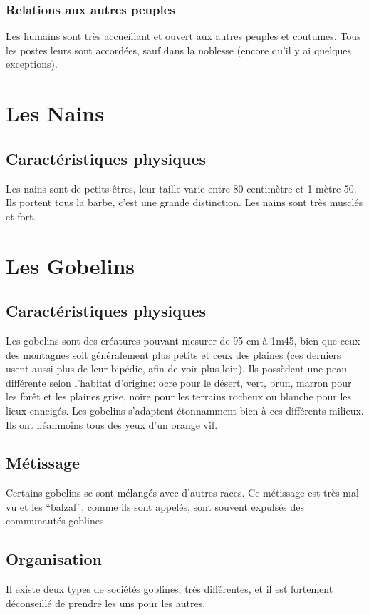 \subsubsection{Relations aux autres peuples}
Les humains sont très accueillant et ouvert aux autres peuples et coutumes. Tous les postes leurs sont accordées, sauf dans la noblesse (encore qu’il y ai quelques exceptions). 

\section{Les Nains}
\subsection{Caractéristiques physiques}
Les nains sont de petits êtres, leur taille varie entre 80 centimètre et 1 mètre 50. Ils portent tous la barbe, c'est une grande distinction. Les nains sont très musclés et fort. 

\section{Les Gobelins}
\subsection{Caractéristiques physiques}
Les gobelins sont des créatures pouvant mesurer de 95 cm à 1m45, bien que ceux des montagnes soit généralement plus petits et ceux des plaines (ces derniers usent aussi plus de leur bipédie, afin de voir plus loin). Ils possèdent une peau différente selon l’habitat d’origine: ocre pour le désert, vert, brun, marron pour les forêt et les plaines grise, noire pour les terrains rocheux ou blanche pour les lieux enneigés. Les gobelins s'adaptent étonnamment bien à ces différents milieux. Ils ont néanmoins tous des yeux d'un orange vif.
\subsection{Métissage}
Certains gobelins se sont mélangés avec d'autres races. Ce métissage est très mal vu et les “balzaf”, comme ils sont appelés, sont souvent expulsés des communautés goblines.
\subsection{Organisation}
Il existe deux types de sociétés goblines, très différentes, et il est fortement déconseillé de prendre les uns pour les autres.
